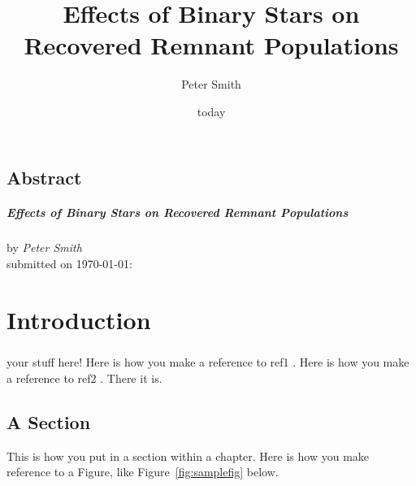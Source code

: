 \documentclass[12pt, oneside]{smuthesis}
\begin{document}
\frontmatter
\title{\sc Effects of Binary Stars on Recovered Remnant Populations}
\author{Peter Smith}
\date{today}
\medskip

\maketitle
\pagestyle{headings}

\begin{center}
\section*{\center \sc Abstract}
\paragraph*{\center \sc Effects of Binary Stars on Recovered Remnant Populations\\}
by {\em Peter Smith}\\
submitted on \today:\\
\end{center}
\newpage

\tableofcontents
\listoffigures
\listoftables
\newpage
%
\mainmatter
\chapter{\sc Introduction}
\paragraph*{}

your stuff here! Here is how you make a reference to ref1 \citep{test1}. Here is how you make a reference to ref2 \citep{test2}. There it is.

\citet{Abbate2018}

\section{\sc A Section}

This is how you put in a section within a chapter.
Here is how you make reference to a Figure, like Figure~\ref{fig:samplefig}
 below.
\end{document}
